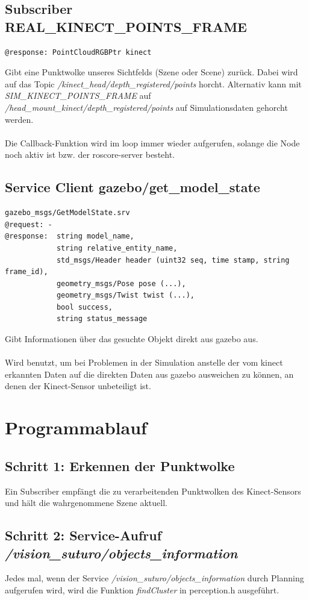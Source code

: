 \documentclass{suturo}
\begin{document}
\subsection*{Subscriber REAL\_KINECT\_POINTS\_FRAME}
\begin{verbatim}
@response: PointCloudRGBPtr kinect
\end{verbatim}
Gibt eine Punktwolke unseres Sichtfelds (Szene oder Scene) zurück. Dabei wird auf das Topic \textit{/kinect\_head/depth\_registered/points} horcht. Alternativ kann mit \textit{SIM\_KINECT\_POINTS\_FRAME} auf \textit{/head\_mount\_kinect/depth\_registered/points} auf Simulationsdaten gehorcht werden.
\\ \\
Die Callback-Funktion wird im loop immer wieder aufgerufen, solange die Node noch aktiv ist bzw. der roscore-server besteht.

\subsection*{Service Client gazebo/get\_model\_state}
\begin{verbatim}
gazebo_msgs/GetModelState.srv
@request: -
@response:  string model_name,
            string relative_entity_name,
            std_msgs/Header header (uint32 seq, time stamp, string frame_id),
            geometry_msgs/Pose pose (...),
            geometry_msgs/Twist twist (...),
            bool success,
            string status_message
\end{verbatim}
Gibt Informationen über das gesuchte Objekt direkt aus gazebo aus.
\\ \\
Wird benutzt, um bei Problemen in der Simulation anstelle der vom kinect erkannten Daten auf die direkten Daten aus gazebo ausweichen zu können, an denen der Kinect-Sensor unbeteiligt ist.

\section*{Programmablauf}
\subsection*{Schritt 1: Erkennen der Punktwolke}
Ein Subscriber empfängt die zu verarbeitenden Punktwolken des Kinect-Sensors und hält die wahrgenommene Szene aktuell.
\subsection*{Schritt 2: Service-Aufruf \textit{/vision\_suturo/objects\_information}}
Jedes mal, wenn der Service \textit{/vision\_suturo/objects\_information} durch Planning aufgerufen wird, wird die Funktion \textit{findCluster} in perception.h ausgeführt. 
\end{document}
